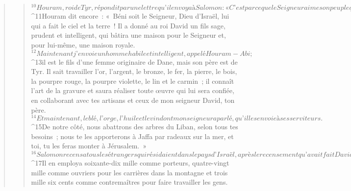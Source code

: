 \begin{verse}
\begin{verse}
${}^{10}Houram, roi de Tyr, répondit par une lettre qu’il envoya à Salomon : « C’est parce que le Seigneur aime son peuple qu’il t’a établi roi sur eux. » 
${}^{11}Houram dit encore : « Béni soit le Seigneur, Dieu d’Israël, lui qui a fait le ciel et la terre ! Il a donné au roi David un fils sage, prudent et intelligent, qui bâtira une maison pour le Seigneur et, pour lui-même, une maison royale. 
${}^{12}Maintenant j’envoie un homme habile et intelligent, appelé Houram-Abi ; 
${}^{13}il est le fils d’une femme originaire de Dane, mais son père est de Tyr. Il sait travailler l’or, l’argent, le bronze, le fer, la pierre, le bois, la pourpre rouge, la pourpre violette, le lin et le carmin ; il connaît l’art de la gravure et saura réaliser toute œuvre qui lui sera confiée, en collaborant avec tes artisans et ceux de mon seigneur David, ton père. 
${}^{14}Et maintenant, le blé, l’orge, l’huile et le vin dont mon seigneur a parlé, qu’il les envoie à ses serviteurs. 
${}^{15}De notre côté, nous abattrons des arbres du Liban, selon tous tes besoins ; nous te les apporterons à Jaffa par radeaux sur la mer, et toi, tu les feras monter à Jérusalem. »
${}^{16}Salomon recensa tous les étrangers qui résidaient dans le pays d’Israël, après le recensement qu’avait fait David son père : on en trouva cent cinquante-trois mille six cents. 
${}^{17}Il en employa soixante-dix mille comme porteurs, quatre-vingt mille comme ouvriers pour les carrières dans la montagne et trois mille six cents comme contremaîtres pour faire travailler les gens.
      

\end{verse}
\end{verse}
